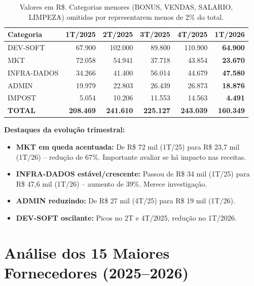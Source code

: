 \documentclass[12pt, a4paper]{article}
\begin{document}
\begin{table}[H]
    \centering
    \small
    \renewcommand{\arraystretch}{1.3}
    \begin{tabularx}{\textwidth}{X r r r r r}
        \toprule
        \rowcolor{tableHeader} \textbf{Categoria} & \textbf{1T/2025} & \textbf{2T/2025} & \textbf{3T/2025} & \textbf{4T/2025} & \textbf{1T/2026} \\
        \midrule
        DEV-SOFT & 67.900 & 102.000 & 89.800 & 110.900 & \textbf{64.900} \\
        MKT & 72.058 & 54.941 & 37.718 & 43.854 & \textbf{23.670} \\
        INFRA-DADOS & 34.266 & 41.400 & 56.014 & 44.679 & \textbf{47.580} \\
        ADMIN & 19.979 & 22.803 & 26.439 & 26.873 & \textbf{18.876} \\
        IMPOST & 5.054 & 10.206 & 11.553 & 14.563 & \textbf{4.491} \\
        \midrule
        \rowcolor{lightGray} \textbf{TOTAL} & \textbf{208.469} & \textbf{241.610} & \textbf{225.127} & \textbf{243.039} & \textbf{160.349} \\
        \bottomrule
    \end{tabularx}
    \caption*{\footnotesize Valores em R\$. Categorias menores (BONUS, VENDAS, SALARIO, LIMPEZA) omitidas por representarem menos de 2\% do total.}
\end{table}

\textbf{Destaques da evolução trimestral:}

\begin{itemize}[nosep]
    \item \textcolor{successGreen}{\textbf{MKT em queda acentuada:}} De R\$ 72 mil (1T/25) para R\$ 23,7 mil (1T/26) -- redução de 67\%. Importante avaliar se há impacto nas receitas.
    \item \textcolor{warningOrange}{\textbf{INFRA-DADOS estável/crescente:}} Passou de R\$ 34 mil (1T/25) para R\$ 47,6 mil (1T/26) -- aumento de 39\%. Merece investigação.
    \item \textcolor{successGreen}{\textbf{ADMIN reduzindo:}} De R\$ 27 mil (4T/25) para R\$ 19 mil (1T/26).
    \item \textcolor{warningOrange}{\textbf{DEV-SOFT oscilante:}} Picos no 2T e 4T/2025, redução no 1T/2026.
\end{itemize}

\newpage
\section{Análise dos 15 Maiores Fornecedores (2025--2026)}
\end{document}
